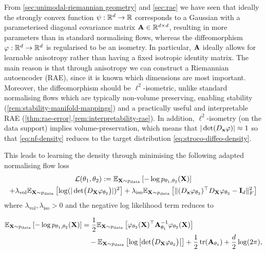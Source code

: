 From \ref{sec:unimodal-riemannian geometry} and \ref{sec:rae} we have seen that ideally the strongly convex function $\psi: \mathbb{R}^{d} \to \mathbb{R}$ corresponds to a Gaussian with a parameterised diagonal covariance matrix $\mathbf{A} \in \mathbb{R}^{d\times d}$, resulting in more parameters than in standard normalising flows, whereas the diffeomorphism $\varphi: \mathbb{R}^{d} \to \mathbb{R}^{d}$ is regularised to be an isometry. In particular, $\mathbf{A}$ ideally allows for learnable anisotropy rather than having a fixed isotropic identity matrix. The main reason is that through anisotropy we can construct a Riemannian autoencoder (RAE), since it is known which dimensions are most important. Moreover, the diffeomorphism should be $\ell^2$-isometric, unlike standard normalising flows which are typically non-volume preserving, enabling stability (\ref{rem:stability-manifold-mappings}) and a practically useful and interpretable RAE  (\ref{thm:rae-error},\ref{rem:interpretability-rae}). In addition, $\ell^2$-isometry (on the data support) implies volume-preservation, which means that $|\det(D_{\mathbf{x}} \varphi)| \approx 1$ so that \ref{eq:nf-density} reduces to the target distribution \ref{eq:stroco-diffeo-density}.

This leads to learning the density through minimising the following adapted normalising flow loss
\begin{multline}\label{eq:basic_training_objective}
    \mathcal{L}(\theta_1, \theta_2) := \mathbb{E}_{\mathbf{X} \sim p_{\text{data}}}\left[-\log p_{\theta_1, \theta_2}(\mathbf{X})\right] \\
    + \lambda_{\text{vol}} \mathbb{E}_{\mathbf{X} \sim p_{\text{data}}}\left[ \log(|\det \bigl( D_{\mathbf{X}} \varphi_{\theta_2} \bigr)|)^2 \right] +
    \lambda_{\text{iso}} \mathbb{E}_{\mathbf{X} \sim p_{\text{data}}}\left[ \|  (D_{\mathbf{x}} \varphi_{\theta_2})^\top D_{\mathbf{X}} \varphi_{\theta_2}  - \mathbf{I}_d\|_F^2 \right]
\end{multline}
where $\lambda_{\text{vol}}, \lambda_{\text{iso}} >0$ and the negative log likelihood term reduces to

\begin{align}
    \mathbb{E}_{\mathbf{X} \sim p_{\text{data}}}\left[-\log p_{\theta_1, \theta_2}(\mathbf{X})\right] 
    &= \frac{1}{2}\mathbb{E}_{\mathbf{X} \sim p_{\text{data}}}\left[\varphi_{\theta_2}(\mathbf{X})^\top \mathbf{A}_{\theta_1}^{-1} \varphi_{\theta_2}(\mathbf{X}) \right] \notag \\
    &\quad - \mathbb{E}_{\mathbf{X} \sim p_{\text{data}}}\left[ \log\left|\det \bigl( D_{\mathbf{X}} \varphi_{\theta_2} \bigr)\right| \right] + \frac{1}{2} \operatorname{tr}(\mathbf{A}_{\theta_1}) + \frac{d}{2}\log(2\pi),
    \end{align}
    



